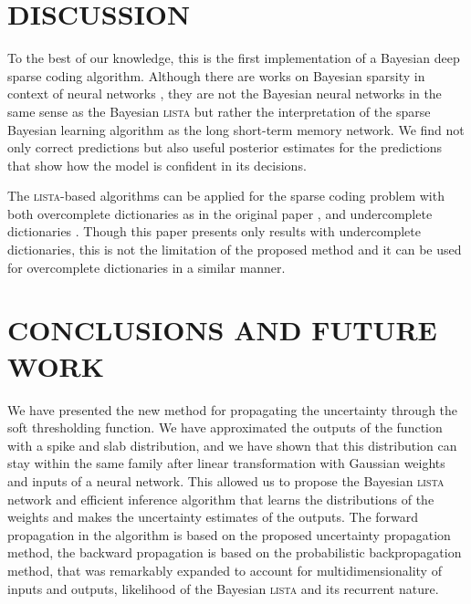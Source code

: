 \documentclass[letterpaper]{article}
\begin{document}
\section{\uppercase{Discussion}}
\label{sec:discussion}
To the best of our knowledge, this is the first implementation of a Bayesian deep sparse coding algorithm. Although there are works on Bayesian sparsity in context of neural networks \citep{he2017bayesian}, they are not the Bayesian neural networks in the same sense as the Bayesian \textsc{lista} but rather the interpretation of the sparse Bayesian  learning algorithm as the long short-term memory network. We find not only correct predictions but also useful posterior estimates for the predictions that show how the model is confident in its decisions.


The \textsc{lista}-based algorithms can be applied for the sparse coding problem with both overcomplete dictionaries as in the original paper \citep{gregor2010learning}, and undercomplete dictionaries \citep{borgerding2017amp}. Though this paper presents only results with undercomplete dictionaries, this is not the limitation of the proposed method and it can be used for overcomplete dictionaries in a similar manner.

\section{\uppercase{Conclusions and future work}}
\label{sec:conclusions}
We have presented the new method for propagating the uncertainty through the soft thresholding function. %
We have approximated the outputs of the function with a spike and slab distribution, and we have shown that this distribution can stay within the same family after linear transformation with Gaussian weights and inputs of a neural network. This allowed us to propose the Bayesian \textsc{lista} network and efficient inference algorithm that learns the distributions of the weights and makes the uncertainty estimates of the outputs. The forward propagation in the algorithm is based on the proposed uncertainty propagation method, the backward propagation is based on the probabilistic backpropagation method, that was remarkably expanded to account for multidimensionality of inputs and outputs, likelihood of the Bayesian \textsc{lista} and its recurrent nature.
\end{document}
